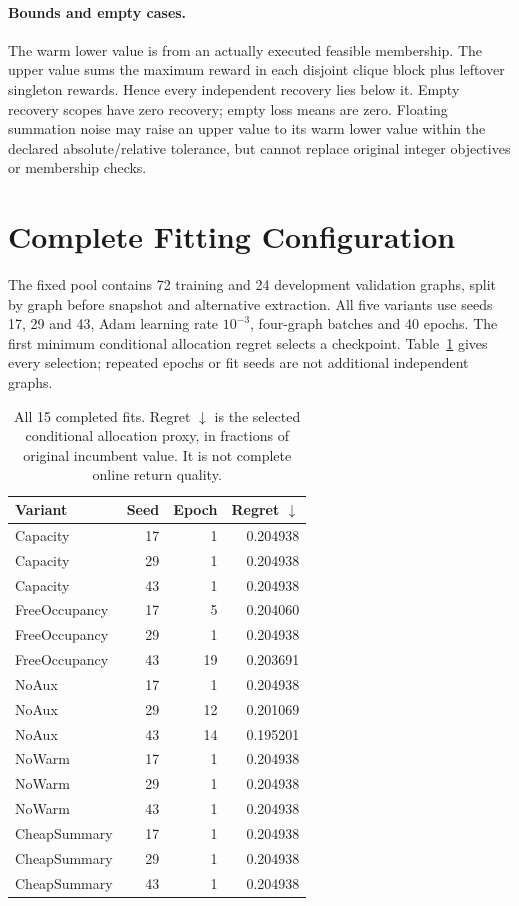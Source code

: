 \paragraph{Bounds and empty cases.}
The warm lower value is from an actually executed feasible membership.
The upper value sums the maximum reward in each disjoint clique block plus
leftover singleton rewards. Hence every independent recovery lies below it.
Empty recovery scopes have zero recovery; empty loss means are zero.
Floating summation noise may raise an upper value to its warm lower value
within the declared absolute/relative tolerance, but cannot replace original
integer objectives or membership checks.

\section{Complete Fitting Configuration}
The fixed pool contains 72 training and 24 development validation graphs,
split by graph before snapshot and alternative extraction. All five variants
use seeds 17, 29 and 43, Adam learning rate $10^{-3}$, four-graph batches and
40 epochs. The first minimum conditional allocation regret selects a
checkpoint. Table~\ref{tab:supp-fit} gives every selection; repeated epochs
or fit seeds are not additional independent graphs.

\begin{table}[t]
\centering
\caption{All 15 completed fits. Regret $\downarrow$ is the selected
conditional allocation proxy, in fractions of original incumbent value.
It is not complete online return quality.}
\label{tab:supp-fit}
\footnotesize
\begin{tabular}{@{}lrrr@{}}
\toprule
Variant & Seed & Epoch & Regret $\downarrow$\\
\midrule
Capacity & 17 & 1 & 0.204938\\
Capacity & 29 & 1 & 0.204938\\
Capacity & 43 & 1 & 0.204938\\
FreeOccupancy & 17 & 5 & 0.204060\\
FreeOccupancy & 29 & 1 & 0.204938\\
FreeOccupancy & 43 & 19 & 0.203691\\
NoAux & 17 & 1 & 0.204938\\
NoAux & 29 & 12 & 0.201069\\
NoAux & 43 & 14 & 0.195201\\
NoWarm & 17 & 1 & 0.204938\\
NoWarm & 29 & 1 & 0.204938\\
NoWarm & 43 & 1 & 0.204938\\
CheapSummary & 17 & 1 & 0.204938\\
CheapSummary & 29 & 1 & 0.204938\\
CheapSummary & 43 & 1 & 0.204938\\
\bottomrule
\end{tabular}
\end{table}


